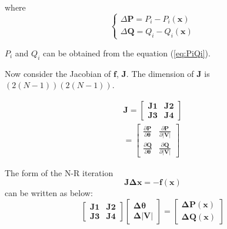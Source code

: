 \documentclass[12pt]{article}
\begin{document}
where 
\begin{equation}\label{eq:DeltaPQ}
\begin{cases}
\Delta\mathbf{P} = P_{i} - P_{i}\left ( \mathbf{x} \right )  \\
\Delta\mathbf{Q} = Q_{i} - Q_{i}\left ( \mathbf{x} \right ) 
\end{cases}
\end{equation}

$P_{i}$ and $Q_i$ can be obtained from the equation (\ref{eq:PiQi}).

Now consider the Jacobian of $\mathbf{f}$, $\mathbf{J}$. The dimension of
$\mathbf{J}$ is $(2(N-1))(2(N-1))$.

\begin{eqnarray}
\mathbf{J}  = \left [ \begin{array}{cc} \mathbf{J1} & \mathbf{J2} \\ \mathbf{J3} & \mathbf{J4} \end{array} \right ] \nonumber \\
            = \left [ \begin{array}{cc} \frac{\partial \mathbf{P}}{\partial \boldsymbol{\theta}} & \frac{\partial \mathbf{P}}{\partial \mathbf{|V|}} \\ \frac{\partial \mathbf{Q}}{\partial \boldsymbol{\theta}} & \frac{\partial \mathbf{Q}}{\partial \mathbf{|V|}}  \end{array} \right ]
\end{eqnarray}

The form of the N-R iteration 
\begin{equation}\label{eq:PFE}
\mathbf{J}\mathbf{\Delta x} = - \mathbf{f} \left ( \mathbf{x} \right )
\end{equation}
can be written as below:
\begin{equation}\label{eq:PFE2}
\left [ \begin{array}{cc} \mathbf{J1} & \mathbf{J2} \\ \mathbf{J3} & \mathbf{J4} \end{array} \right ] \left [ \begin{array}{c} \mathbf{\Delta \theta} \\ \mathbf{\Delta |V|} \end{array} \right ] =  \left [ \begin{array}{c} \mathbf{\Delta P} \left (\mathbf{x} \right ) \\  \mathbf{\Delta Q} \left (\mathbf{x} \right ) \end{array} \right ]
\end{equation}
\end{document}
